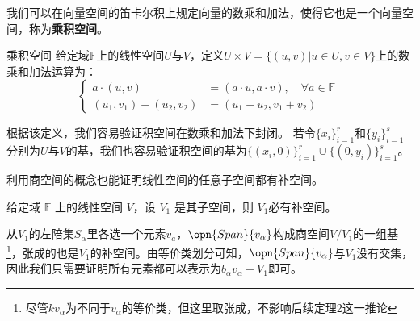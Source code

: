 
\begin{issues}
\issueTODO
\end{issues}


我们可以在向量空间的笛卡尔积上规定向量的数乘和加法，使得它也是一个向量空间，称为\textbf{乘积空间}。

\begin{definition}{乘积空间}
给定域$\mathbb F $上的线性空间$U$与$V$，定义$U\times V=\{(u, v)|u \in U, v \in V\}$上的数乘和加法运算为：
\begin{equation}
\left\{\begin{aligned}
a \cdot (u, v) &= (a \cdot u, a \cdot v), \quad \forall a \in \mathbb F\\
(u_1, v_1) + (u_2, v_2) &= (u_1 + u_2, v_1 + v_2)
\end{aligned}\right.~
\end{equation}
\end{definition}
根据该定义，我们容易验证积空间在数乘和加法下封闭。
若令$\{x_i\}^r_{i=1}$和$\{y_i\}^s_{i=1}$分别为$U$与$V$的基，我们也容易验证积空间的基为$\{(x_i, 0)\}^r_{i=1}\cup \{(0, y_i)\}^s_{i=1}$。

% 




利用商空间的概念也能证明线性空间的任意子空间都有补空间。
\begin{theorem}{}\label{the_lnal06_1}
给定域 $\mathbb F$ 上的线性空间 $V$，设 $V_1$ 是其子空间，则 $V_1$必有补空间。
\end{theorem}
从$V_1$的左陪集${S_{\alpha}}$里各选一个元素$v_a$，$\opn{Span} \{v_{\alpha}\}$构成商空间$V/V_1$的一组基\footnote{尽管$kv_\alpha$为不同于$v_\alpha$的等价类，但这里取张成，不影响后续定理2这一推论}，张成的也是$V_1$的补空间。由等价类划分可知，$\opn{Span} \{v_{\alpha}\}$与$V_1$没有交集，因此我们只需要证明所有元素都可以表示为$b_{\alpha}v_{\alpha} + V_1$即可。

